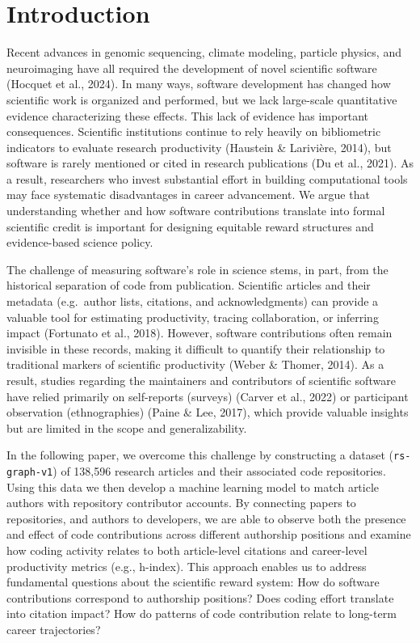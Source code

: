 \documentclass[
  number,
  3p,
  onecolumn]{elsarticle}
\begin{document}
\section{Introduction}\label{introduction}

Recent advances in genomic sequencing, climate modeling, particle
physics, and neuroimaging have all required the development of novel
scientific software (Hocquet et al., 2024). In many ways, software
development has changed how scientific work is organized and performed,
but we lack large-scale quantitative evidence characterizing these
effects. This lack of evidence has important consequences. Scientific
institutions continue to rely heavily on bibliometric indicators to
evaluate research productivity (Haustein \& Larivière, 2014), but
software is rarely mentioned or cited in research publications (Du et
al., 2021). As a result, researchers who invest substantial effort in
building computational tools may face systematic disadvantages in career
advancement. We argue that understanding whether and how software
contributions translate into formal scientific credit is important for
designing equitable reward structures and evidence-based science policy.

The challenge of measuring software's role in science stems, in part,
from the historical separation of code from publication. Scientific
articles and their metadata (e.g.~author lists, citations, and
acknowledgments) can provide a valuable tool for estimating
productivity, tracing collaboration, or inferring impact (Fortunato et
al., 2018). However, software contributions often remain invisible in
these records, making it difficult to quantify their relationship to
traditional markers of scientific productivity (Weber \& Thomer, 2014).
As a result, studies regarding the maintainers and contributors of
scientific software have relied primarily on self-reports (surveys)
(Carver et al., 2022) or participant observation (ethnographies) (Paine
\& Lee, 2017), which provide valuable insights but are limited in the
scope and generalizability.

In the following paper, we overcome this challenge by constructing a
dataset (\texttt{rs-graph-v1}) of 138,596 research articles and their
associated code repositories. Using this data we then develop a machine
learning model to match article authors with repository contributor
accounts. By connecting papers to repositories, and authors to
developers, we are able to observe both the presence and effect of code
contributions across different authorship positions and examine how
coding activity relates to both article-level citations and career-level
productivity metrics (e.g., h-index). This approach enables us to
address fundamental questions about the scientific reward system: How do
software contributions correspond to authorship positions? Does coding
effort translate into citation impact? How do patterns of code
contribution relate to long-term career trajectories?
\end{document}
